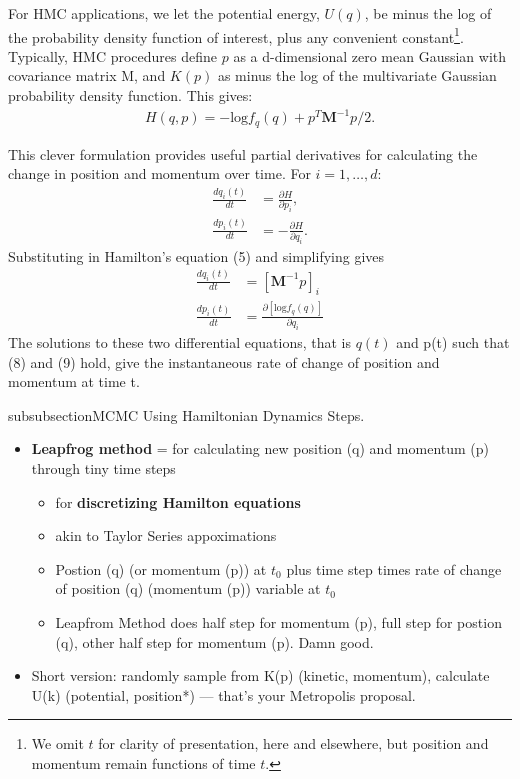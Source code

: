 For HMC applications, we let the potential energy, $U(q)$, be minus the log of the probability density function of interest, plus any convenient constant\footnote{We omit $t$ for clarity of presentation, here and elsewhere, but position and momentum remain functions of time $t$.}. Typically, HMC procedures define $p$ as a d-dimensional zero mean Gaussian with covariance matrix M, and $K(p)$ as minus the log of the multivariate Gaussian probability density function. This gives:
\begin{align}
H(q,p) = -\text{log}f_{q}(q) + p^{T}\pmb{M}^{-1}p/2.
\end{align}

This clever formulation provides useful partial derivatives for calculating the change in position and momentum over time. For $i = 1,\dots, d$:
\begin{align}
\frac{d q_{i}(t)}{dt} &= \frac{\partial H}{\partial p_{i}}, \\
\frac{d p_{i}(t)}{dt} &= -\frac{\partial H}{\partial q_{i}}.
\end{align}
Substituting in Hamilton's equation (5) and simplifying gives
\begin{align}
\frac{d q_{i}(t)}{dt} &=  [\pmb{M}^{-1}p]_{i} \\
\frac{d p_{i}(t)}{dt} &= \frac {\partial \left[ \text{log}f_{q}(q) \right]}{\partial q_{i}}
\end{align}
The solutions to these two differential equations, that is $q(t)$ and p(t) such that (8) and (9) hold, give the instantaneous rate of change of position and momentum at time t. 

subsubsection{MCMC Using Hamiltonian Dynamics \citep{Neal2011}} %
Steps.

\begin{itemize}

\item {\bf Leapfrog method} = for calculating new position (q) and momentum (p) through tiny time steps
  \begin{itemize}
  \item for {\bf discretizing Hamilton equations}
  \item akin to Taylor Series appoximations
  \item Postion (q) (or momentum (p)) at $t_{0}$ plus time step times rate of change of position (q) (momentum (p)) variable at $t_{0}$
  \item Leapfrom Method does half step for momentum (p), full step for postion (q), other half step for momentum (p). Damn good.

  \end{itemize}

\item Short version: randomly sample from K(p) (kinetic, momentum), calculate U(k) (potential, position*) --- that's your Metropolis proposal.
\end{itemize}


